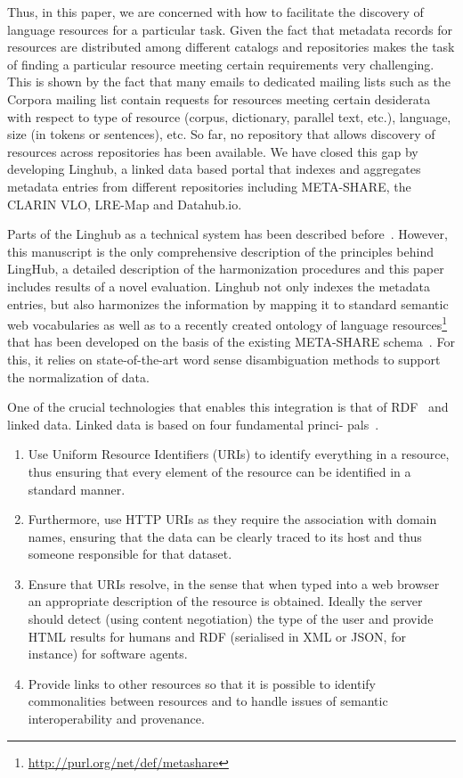 \documentclass[smallextended]{svjour3}       %
\begin{document}
Thus, in this paper, we are concerned with how to facilitate the discovery of language
resources for a particular task. Given the fact that metadata records for
resources are distributed among different catalogs and repositories makes the
task of finding a particular resource meeting certain requirements very
challenging. This is shown by the fact that many emails to dedicated
mailing lists such as the Corpora mailing list contain requests for resources
meeting certain desiderata with respect to type of resource (corpus, dictionary,
parallel text, etc.), language, size (in tokens or sentences), etc.
So far, no repository that allows discovery of resources across repositories has
been available. We have closed this gap by developing Linghub, a linked data
based portal that indexes and aggregates metadata entries from different
repositories including META-SHARE, the CLARIN VLO, LRE-Map and Datahub.io.

Parts of the Linghub as a technical system has been described
before~\cite{mccrae2015reconciling,mccrae2015linghub}. 
 However, this manuscript is the only comprehensive description of the
 principles behind LingHub, a detailed description of the harmonization
 procedures and this paper includes results of a novel evaluation.
Linghub not
only indexes the metadata entries, but also harmonizes the information by
mapping it to standard semantic web vocabularies as well as to a recently created ontology of language resources\footnote{\url{http://purl.org/net/def/metashare}} that has been developed on the basis of the existing
META-SHARE schema~\cite{mccrae2015ontology}.
For this, it relies on state-of-the-art word sense disambiguation methods to
support the normalization of data. 

One of the crucial technologies that enables this integration is that of
RDF~\cite{klyne2006resource} and linked data. Linked data is based on four fundamental princi-
pals~\cite{bizer2009linked}.

\begin{enumerate}
    \item Use Uniform Resource Identifiers  (URIs) to identify everything in a resource, thus
        ensuring that every element of the resource can be identified in a standard
        manner.
    \item Furthermore, use HTTP URIs as they require the association with domain names,
        ensuring that the data can be clearly traced to its host and thus someone
        responsible for that dataset.
    \item Ensure that URIs resolve, in the sense that when typed into a web browser an
        appropriate description of the resource is obtained. Ideally the server should
        detect (using content negotiation) the type of the user and provide HTML
        results for humans and RDF (serialised in XML or JSON, for instance) for software agents.
    \item Provide links to other resources so that it is possible to identify
        commonalities between resources and to handle issues of semantic
        interoperability and provenance.
\end{enumerate}
\end{document}
